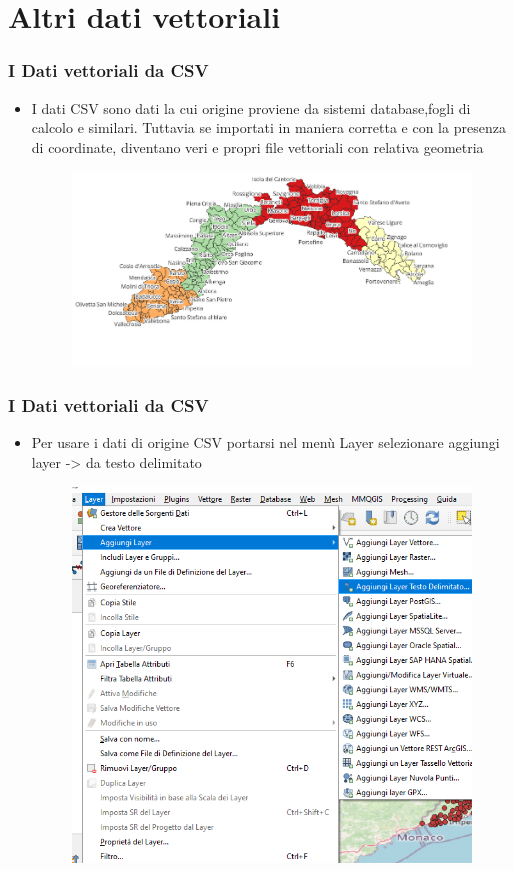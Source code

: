 \documentclass{beamer}
\begin{document}
{\section{Altri dati vettoriali}
 \begin{frame}
   \frametitle{I Dati vettoriali da CSV}
   \begin{itemize}
       \item I dati CSV sono dati la cui origine proviene da sistemi database,fogli di calcolo e similari. Tuttavia se importati in maniera corretta e con la presenza di coordinate, diventano veri e propri file vettoriali con relativa geometria
       \begin{figure}
           \centering
           \includegraphics[width=0.75\linewidth]{immagine.png}
           
           \label{fig:enter-label}
       \end{figure}
   \end{itemize}
   \end{frame}

\begin{frame}
   \frametitle{I Dati vettoriali da CSV}
   \begin{itemize}
       \item Per usare i dati di origine CSV portarsi nel menù Layer selezionare aggiungi layer -> da testo delimitato
       \begin{figure}
           \centering
           \includegraphics[width=0.5\linewidth]{layer.png}
                     

\end{figure}
\end{itemize}
\end{frame}}
\end{document}
